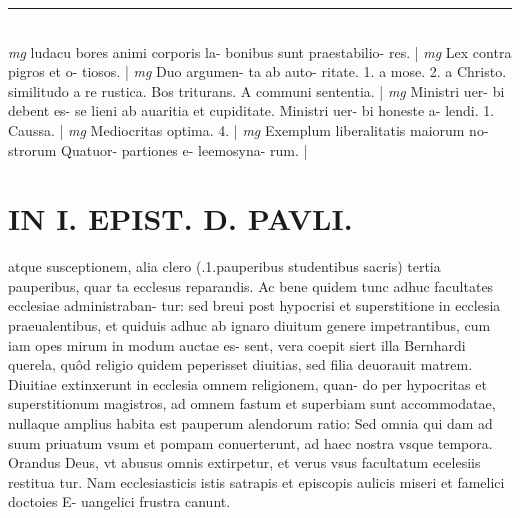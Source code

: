 \documentclass{article}
\begin{document}
\begin{pages}
\vspace{0.5cm}\noindent
\vspace{0.2cm}\rule{1cm}{0.2pt}\\ 
\hspace{0.2cm}\textit{mg}
\footnotesize ludacu bores animi corporis la- bonibus sunt praestabilio- res. 
\normalsize| 
\hspace{0.2cm}\textit{mg}
\footnotesize Lex contra pigros et o- tiosos. 
\normalsize| 
\hspace{0.2cm}\textit{mg}
\footnotesize Duo argumen- ta ab auto- ritate. 1. a mose. 2. a Christo. similitudo a re rustica. Bos triturans. A communi sententia. 
\normalsize| 
\hspace{0.2cm}\textit{mg}
\footnotesize Ministri uer- bi debent es- se lieni ab auaritia et cupiditate. Ministri uer- bi honeste a- lendi. 1. Caussa. 
\normalsize| 
\hspace{0.2cm}\textit{mg}
\footnotesize Mediocritas optima. 4. 
\normalsize| 
\hspace{0.2cm}\textit{mg}
\footnotesize Exemplum liberalitatis maiorum no- strorum Quatuor- partiones e- leemosyna- rum. 
\normalsize| 
\section*{IN I. EPIST. D. PAVLI. }
\marginpar{[ p.114 ]}\pstart atque susceptionem, alia clero (.1.pauperibus studentibus sacris) tertia pauperibus, quar ta ecclesus reparandis. Ac bene quidem tunc adhuc facultates ecclesiae administraban- tur: sed breui post hypocrisi et superstitione in ecclesia praeualentibus, et quiduis adhuc ab ignaro diuitum genere impetrantibus, cum iam opes mirum in modum auctae es- sent, vera coepit siert illa Bernhardi querela, quôd religio quidem peperisset diuitias, sed filia deuorauit matrem. Diuitiae extinxerunt in ecclesia omnem religionem, quan- do per hypocritas et superstitionum magistros, ad omnem fastum et superbiam sunt accommodatae, nullaque amplius habita est pauperum alendorum ratio: Sed omnia qui dam ad suum priuatum vsum et pompam conuerterunt, ad haec nostra vsque tempora. Orandus Deus, vt abusus omnis extirpetur, et verus vsus facultatum ecelesiis restitua tur. Nam ecclesiasticis istis satrapis et episcopis aulicis miseri et famelici doctoies E- uangelici frustra canunt.  \pend
{}
{}

\end{pages}
\end{document}
